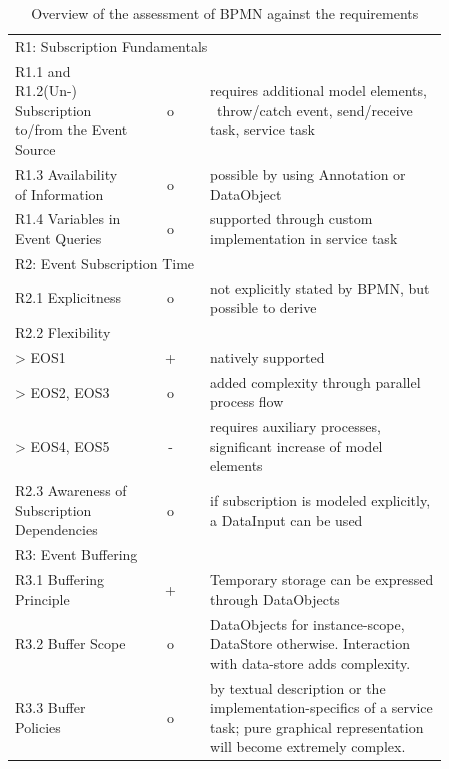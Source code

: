 \begin{table}%
	\myfloatalign
	\begin{tabularx}{\textwidth}{p{0.3\linewidth} | c | p{0.555\linewidth}}
		\toprule
		\tableheadline{Requirement} & \tableheadline{Ev.} & \tableheadline{Explanation} \\ 
		\midrule
		
		\multicolumn{3}{p{\linewidth}}{\rule{0pt}{4ex} R1: Subscription Fundamentals} \\
		\midrule
		
		R1.1 and R1.2\newline(Un-)\,Subscription to/from the Event Source & o & requires additional model elements, \eg~throw/catch event, send/receive task, service task \\
		R1.3 Availability of Information & o & possible by using Annotation or DataObject  \\
		R1.4 Variables in Event Queries & o & supported through custom implementation in service task \\
		
		\midrule
		\multicolumn{3}{p{\linewidth}}{\rule{0pt}{4ex} R2: Event Subscription Time} \\
		\midrule
		
		R2.1 Explicitness & o & not explicitly stated by BPMN, but possible to derive \\
		R2.2 Flexibility & & \\
		> EOS1 & + & natively supported \\
		> EOS2, EOS3 & o & added complexity through parallel process flow \\
		> EOS4, EOS5 & - & requires auxiliary processes, significant increase of model elements \\
		R2.3 Awareness of Subscription Dependencies & o & if subscription is modeled explicitly, a DataInput can be used \\
		
		\midrule
		\multicolumn{3}{p{\linewidth}}{\rule{0pt}{4ex} R3: Event Buffering} \\
		\midrule
		
		R3.1 Buffering Principle & + & Temporary storage can be expressed through DataObjects \\
		R3.2 Buffer Scope & o & DataObjects for instance-scope, DataStore otherwise. Interaction with data-store adds complexity. \\
		R3.3 Buffer Policies & o & by textual description or the implementation-specifics of a service task; pure graphical representation will become extremely complex. \\
		
	\end{tabularx}
	\caption[Overview of the assessment of BPMN against the requirements]{Overview of the assessment of BPMN against the requirements}
	\label{tab:assessment-bpmn}
\end{table}

